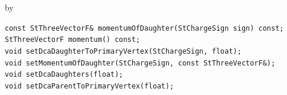 \documentclass[twoside]{article}
\newcommand{\entrylabel}[1]{\mbox{\textbf{{#1}}}\hfil}%
\newenvironment{entry}
{\begin{list}{}%
    {\renewcommand{\makelabel}{\entrylabel}%
     \setlength{\labelwidth}{90pt}%
     \setlength{\leftmargin}{\labelwidth}
     \advance\leftmargin by \labelsep%
      }%
    }%
  {\end{list}}
\newcommand{\Entrylabel}[1]%
{\raisebox{0pt}[1ex][0pt]{\makebox[\labelwidth][l]%
    {\parbox[t]{\labelwidth}{\hspace{0pt}\textbf{{#1}}}}}}
\newenvironment{Entry}%
{\renewcommand{\entrylabel}{\Entrylabel}\begin{entry}}%
  {\end{entry}}
\begin{document}
\begin{Entry}
    \verb+const StThreeVectorF& momentumOfDaughter(StChargeSign sign) const;+\\

    \verb+StThreeVectorF momentum() const;+\\

    \verb+void setDcaDaughterToPrimaryVertex(StChargeSign, float);+\\

    \verb+void setMomentumOfDaughter(StChargeSign, const StThreeVectorF&);+\\

    \verb+void setDcaDaughters(float);+\\

    \verb+void setDcaParentToPrimaryVertex(float);+\\
\end{Entry}
\clearpage
\end{document}
